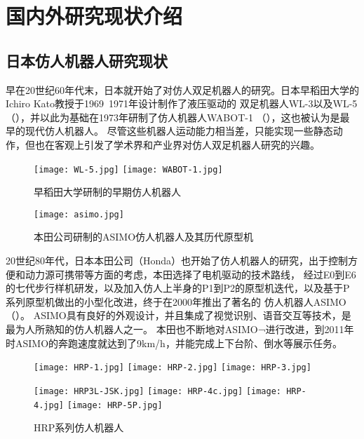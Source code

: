 \section{国内外研究现状介绍}
\subsection{日本仿人机器人研究现状}

早在20世纪60年代末，日本就开始了对仿人双足机器人的研究。日本早稻田大学的Ichiro Kato教授于1969~1971年设计制作了液压驱动的
双足机器人WL-3以及WL-5（），并以此为基础在1973年研制了仿人机器人WABOT-1 （），这也被认为是最早的现代仿人机器人。
尽管这些机器人运动能力相当差，只能实现一些静态动作，但也在客观上引发了学术界和产业界对仿人双足机器人研究的兴趣。

\begin{figure}[htbp]
    \centering
        {%
            \texttt{[image: WL-5.jpg]}}
        {%
            \texttt{[image: WABOT-1.jpg]}}
    \caption{早稻田大学研制的早期仿人机器人\label{fig:japan_old}}
\end{figure}
\begin{figure}[htbp]
    \centering
    \texttt{[image: asimo.jpg]}
    \caption{\label{fig:asimo}本田公司研制的ASIMO仿人机器人及其历代原型机}
\end{figure}

20世纪80年代，日本本田公司（Honda）也开始了仿人机器人的研究，出于控制方便和动力源可携带等方面的考虑，本田选择了电机驱动的技术路线，
经过E0到E6的七代步行样机研发，以及加入仿人上半身的P1到P2的原型机迭代，以及基于P系列原型机做出的小型化改进，终于在2000年推出了著名的
仿人机器人ASIMO（）。 ASIMO具有良好的外观设计，并且集成了视觉识别、语音交互等技术，是最为人所熟知的仿人机器人之一。
本田也不断地对ASIMO¬进行改进，到2011年时ASIMO的奔跑速度就达到了9km/h，并能完成上下台阶、倒水等展示任务\cite{Honda}。

\begin{figure}[htbp]
    \centering
        {%
            \texttt{[image: HRP-1.jpg]}}
        {%
            \texttt{[image: HRP-2.jpg]}}
        {%
            \texttt{[image: HRP-3.jpg]}}

        {%
            \texttt{[image: HRP3L-JSK.jpg]}}   
        {%
            \texttt{[image: HRP-4c.jpg]}}       
        {%
            \texttt{[image: HRP-4.jpg]}}       
        {%
            \texttt{[image: HRP-5P.jpg]}}       

    \caption{HRP系列仿人机器人\label{fig:japan_hrp}}
\end{figure}


